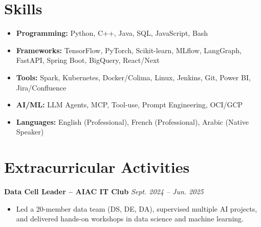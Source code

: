\documentclass[11pt,a4paper]{article}
\newcommand{\resumeProject}[2]{
  \vspace{3pt}
  \noindent\textbf{#1} \hfill \textit{#2}
  \vspace{2pt}
}
\begin{document}
\section{Skills}
\begin{itemize}[label={}]
  \item \textbf{Programming:} Python, C++, Java, SQL, JavaScript, Bash
  \item \textbf{Frameworks:} TensorFlow, PyTorch, Scikit-learn, MLflow, LangGraph, FastAPI, Spring Boot, BigQuery, React/Next
  \item \textbf{Tools:} Spark, Kubernetes, Docker/Colima, Linux, Jenkins, Git, Power BI, Jira/Confluence
  \item \textbf{AI/ML:} LLM Agents, MCP, Tool-use, Prompt Engineering, OCI/GCP
  \item \textbf{Languages:} English (Professional), French (Professional), Arabic (Native Speaker)
\end{itemize}

\section{Extracurricular Activities}
\resumeProject{Data Cell Leader -- AIAC IT Club}{Sept. 2024 -- Jun. 2025}
\begin{itemize}
  \item Led a 20-member data team (DS, DE, DA), supervised multiple AI projects, and delivered hands-on workshops in data science and machine learning.
\end{itemize}
\end{document}
